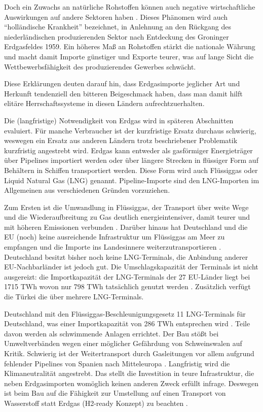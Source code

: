 Doch ein Zuwachs an natürliche Rohstoffen können auch negative wirtschaftliche Auswirkungen auf andere Sektoren haben \cite{nrgi}. Dieses Phänomen wird auch ``holländische Krankheit'' bezeichnet, in Anlehnung an den Rückgang des niederländischen produzierenden Sektor nach Entdeckung des Groninger Erdgasfeldes 1959. Ein höheres Maß an Rohstoffen stärkt die nationale Währung und macht damit Importe günstiger und Exporte teurer, was auf lange Sicht die Wettbewerbsfähigkeit des produzierendes Gewerbes schwächt.

Diese Erklärungen deuten darauf hin, dass Erdgasimporte jeglicher Art und Herkunft tendenziell den bitteren Beigeschmack haben, dass man damit hilft elitäre Herrschaftssysteme in diesen Ländern aufrechtzuerhalten.

Die (langfristige) Notwendigkeit von Erdgas wird in späteren Abschnitten evaluiert. Für manche Verbraucher ist der kurzfristige Ersatz durchaus schwierig, weswegen ein Ersatz aus anderen Ländern trotz beschriebener Problematik kurzfristig angestrebt wird. Erdgas kann entweder als gasförmiger Energieträger über Pipelines importiert werden oder über längere Strecken in flüssiger Form auf Behältern in Schiffen transportiert werden. Diese Form wird auch Flüssiggas oder Liquid Natural Gas (LNG) genannt. Pipeline-Importe sind den LNG-Importen im Allgemeinen aus verschiedenen Gründen vorzuziehen. 

Zum Ersten ist die Umwandlung in Flüssiggas, der Transport über weite Wege und die Wiederaufbreitung zu Gas deutlich energieintensiver, damit teurer und mit höheren Emissionen verbunden \cite{lng-faq}. 
Darüber hinaus hat Deutschland und die EU (noch) keine ausreichende Infrastruktur um Flüssiggas am Meer zu empfangen und die Importe ins Landesinnere weiterzutransportieren \cite{iwd}. Deutschland besitzt bisher noch keine LNG-Terminals, die Anbindung anderer EU-Nachbarländer ist jedoch gut. 
Die Umschlagskapazität der Terminals ist nicht ausgereizt: die Importkapazität der LNG-Terminals der 27 EU-Länder liegt bei 1715 TWh wovon nur 798 TWh tatsächlich genutzt werden \cite{leo}. Zusätzlich verfügt die Türkei die über mehrere LNG-Terminals. 


Deutschland mit den Flüssiggas-Beschleunigungsgesetz 11 LNG-Terminals für Deutschland, was einer Importkapazität von 286 TWh entsprechen wird \cite{lng-gesetz}. Teile davon werden als schwimmende Anlagen errichtet. Der Bau stößt bei Umweltverbänden wegen einer möglicher Gefährdung von Schweinswalen auf Kritik.
Schwierig ist der Weitertransport durch Gasleitungen vor allem aufgrund fehlender Pipelines von Spanien nach Mitteleuropa \cite{iwd}.
Langfristig wird die Klimaneutralität angestrebt. Das stellt die Investition in teure Infrastruktur, die neben Erdgasimporten womöglich keinen anderen Zweck erfüllt infrage. Deswegen ist beim Bau auf die Fähigkeit zur Umstellung auf einen Transport von Wasserstoff statt Erdgas (H2-ready Konzept) zu beachten \cite{leo}.

